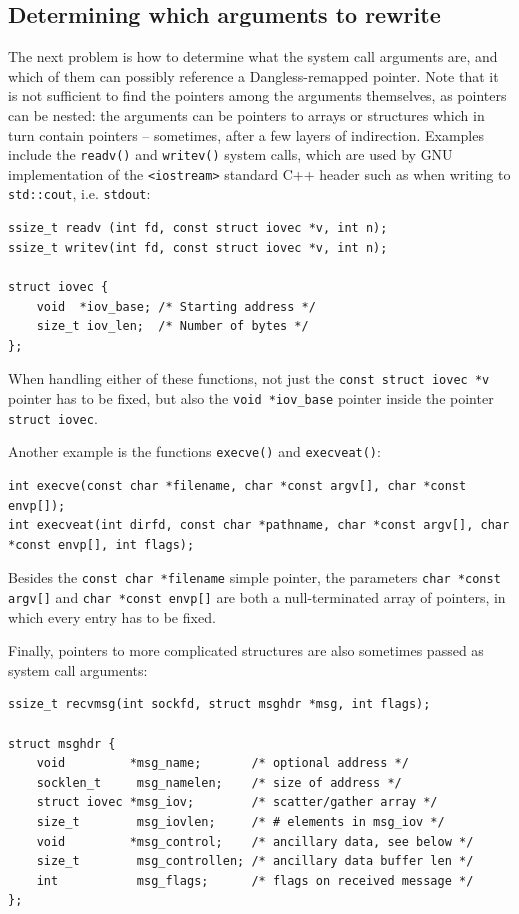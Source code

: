 \subsection{Determining which arguments to rewrite}

The next problem is how to determine what the system call arguments are, and which of them can possibly reference a Dangless-remapped pointer. Note that it is not sufficient to find the pointers among the arguments themselves, as pointers can be nested: the arguments can be pointers to arrays or structures which in turn contain pointers -- sometimes, after a few layers of indirection. Examples include the \lstinline!readv()! and \lstinline!writev()! system calls, which are used by GNU implementation of the \lstinline!<iostream>! standard C++ header such as when writing to \lstinline!std::cout!, i.e. \lstinline!stdout!:

\begin{lstlisting}
ssize_t readv (int fd, const struct iovec *v, int n);
ssize_t writev(int fd, const struct iovec *v, int n);

struct iovec {
	void  *iov_base; /* Starting address */
	size_t iov_len;  /* Number of bytes */
};
\end{lstlisting}

When handling either of these functions, not just the \lstinline!const struct iovec *v! pointer has to be fixed, but also the \lstinline!void *iov_base! pointer inside the pointer \lstinline!struct iovec!.

Another example is the functions \lstinline!execve()! and \lstinline!execveat()!:

\begin{lstlisting}
int execve(const char *filename, char *const argv[], char *const envp[]);
int execveat(int dirfd, const char *pathname, char *const argv[], char *const envp[], int flags);
\end{lstlisting}

Besides the \lstinline!const char *filename! simple pointer, the parameters \lstinline!char *const argv[]! and \lstinline!char *const envp[]! are both a null-terminated array of pointers, in which every entry has to be fixed.

Finally, pointers to more complicated structures are also sometimes passed as system call arguments:

\begin{lstlisting}
ssize_t recvmsg(int sockfd, struct msghdr *msg, int flags);

struct msghdr {
	void         *msg_name;       /* optional address */
	socklen_t     msg_namelen;    /* size of address */
	struct iovec *msg_iov;        /* scatter/gather array */
	size_t        msg_iovlen;     /* # elements in msg_iov */
	void         *msg_control;    /* ancillary data, see below */
	size_t        msg_controllen; /* ancillary data buffer len */
	int           msg_flags;      /* flags on received message */
};
\end{lstlisting}

